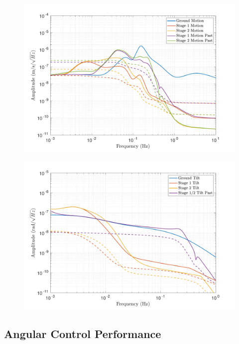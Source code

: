 \documentclass [12pt, proquest]{uwthesis}[2019]
\begin{document}
\begin{figure}%
\begin{center}
\includegraphics[width=\textwidth]{cBRS_Model_CompX.pdf}
\caption{}
\label{cBRSCompR}
\end{center}
\end{figure}

\begin{figure}%
\begin{center}
\includegraphics[width=\textwidth]{cBRS_Model_CompRX.pdf}
\caption{}
\label{cBRSCompX}
\end{center}
\end{figure}

\subsection{Angular Control Performance}
\end{document}

